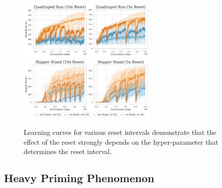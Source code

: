 \begin{figure}[ht]
  \centering
  \includegraphics[width=0.6\textwidth]{Figures/5Appendix/reset_times_QR.pdf}
  \includegraphics[width=0.6\textwidth]{Figures/5Appendix/reset_times.pdf}
  \caption{Learning curves for various reset intervals demonstrate that the effect of the reset strongly depends on the hyper-parameter that determines the reset interval.}
  \label{appendix_fig:reset_interval}
\end{figure}

\newpage
\subsection{Heavy Priming Phenomenon}
\label{Appendix: Heavy Priming}

